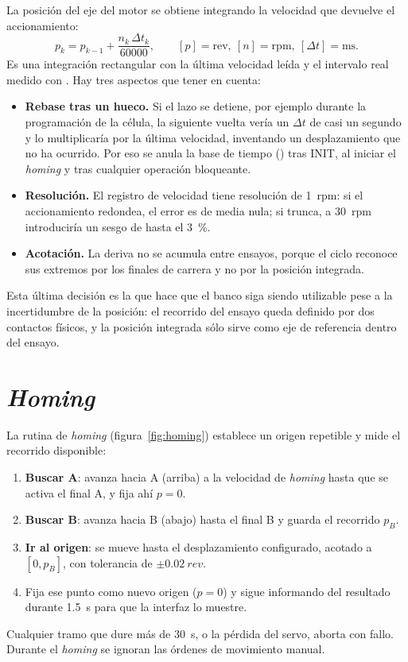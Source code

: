 La posición del eje del motor se obtiene integrando la velocidad que devuelve el accionamiento:
\begin{equation}
  p_k = p_{k-1} + \frac{n_k\,\Delta t_k}{60000}, \qquad [p]=\text{rev},\ [n]=\text{rpm},\ [\Delta t]=\text{ms}.
\end{equation}
Es una integración rectangular con la última velocidad leída y el intervalo real medido con
. Hay tres aspectos que tener en cuenta:
\begin{itemize}
  \item \textbf{Rebase tras un hueco.} Si el lazo se detiene, por ejemplo durante la programación de
        la célula, la siguiente vuelta vería un $\Delta t$ de casi un segundo y lo multiplicaría por
        la última velocidad, inventando un desplazamiento que no ha ocurrido. Por eso se anula la
        base de tiempo () tras INIT, al iniciar el \emph{homing} y tras
        cualquier operación bloqueante.
  \item \textbf{Resolución.} El registro de velocidad tiene resolución de \SI{1}{rpm}: si el
        accionamiento redondea, el error es de media nula; si trunca, a \SI{30}{rpm} introduciría un
        sesgo de hasta el \SI{3}{\percent}.
  \item \textbf{Acotación.} La deriva no se acumula entre ensayos, porque el ciclo reconoce sus
        extremos por los finales de carrera y no por la posición integrada.
\end{itemize}

Esta última decisión es la que hace que el banco siga siendo utilizable pese a la incertidumbre de
la posición: el recorrido del ensayo queda definido por dos contactos físicos, y la posición
integrada sólo sirve como eje de referencia dentro del ensayo.

\section{\emph{Homing}}

La rutina de \emph{homing} (figura~\ref{fig:homing}) establece un origen repetible y mide el
recorrido disponible:
\begin{enumerate}
  \item \textbf{Buscar A}: avanza hacia A (arriba) a la velocidad de \emph{homing} hasta que se
        activa el final A, y fija ahí $p=0$.
  \item \textbf{Buscar B}: avanza hacia B (abajo) hasta el final B y guarda el recorrido $p_B$.
  \item \textbf{Ir al origen}: se mueve hasta el desplazamiento configurado, acotado a $[0, p_B]$,
        con tolerancia de $\pm\SI{0.02}{rev}$.
  \item Fija ese punto como nuevo origen ($p=0$) y sigue informando del resultado durante
        \SI{1.5}{\second} para que la interfaz lo muestre.
\end{enumerate}
Cualquier tramo que dure más de \SI{30}{\second}, o la pérdida del servo, aborta con fallo. Durante
el \emph{homing} se ignoran las órdenes de movimiento manual.

